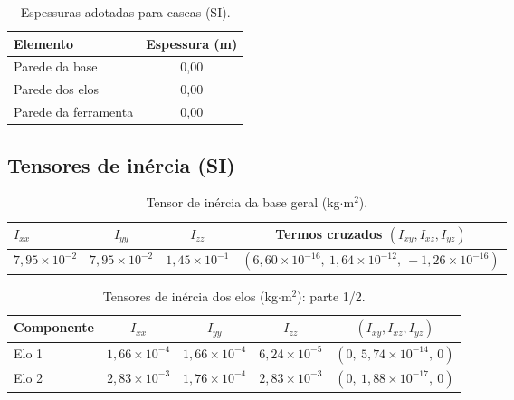 \begin{table}[H]
\centering
\caption{Espessuras adotadas para cascas (SI).}
\label{tab:chaser_espessuras_SI}
\begin{tabular}{lc}
\hline
\textbf{Elemento} & \textbf{Espessura (m)} \\
\hline
Parede da base & 0,00 \\
Parede dos elos & 0,00 \\
Parede da ferramenta & 0,00 \\
\hline
\end{tabular}
\end{table}

\subsection{Tensores de inércia (SI)}


\begin{table}[H]
\centering
\caption{Tensor de inércia da base geral (kg$\cdot$m$^2$).}
\label{tab:chaser_I_base_SI}
\begin{tabular}{lccc}
\hline
$I_{xx}$ & $I_{yy}$ & $I_{zz}$ & Termos cruzados $(I_{xy}, I_{xz}, I_{yz})$ \\
\hline
$7,95\times 10^{-2}$ & $7,95\times 10^{-2}$ & $1,45\times 10^{-1}$ &
$(6,60\times 10^{-16},\ 1,64\times 10^{-12},\ -1,26\times 10^{-16})$ \\
\hline
\end{tabular}
\end{table}

\begin{table}[H]
\centering
\caption{Tensores de inércia dos elos (kg$\cdot$m$^2$): parte 1/2.}
\label{tab:chaser_I_elos_1_SI}
\begin{tabular}{lcccc}
\hline
\textbf{Componente} & $I_{xx}$ & $I_{yy}$ & $I_{zz}$ & $(I_{xy}, I_{xz}, I_{yz})$ \\
\hline
Elo 1 &
$1,66\times 10^{-4}$ &
$1,66\times 10^{-4}$ &
$6,24\times 10^{-5}$ &
$(0,\ 5,74\times 10^{-14},\ 0)$ \\
Elo 2 &
$2,83\times 10^{-3}$ &
$1,76\times 10^{-4}$ &
$2,83\times 10^{-3}$ &
$(0,\ 1,88\times 10^{-17},\ 0)$ \\
\hline
\end{tabular}
\end{table}

